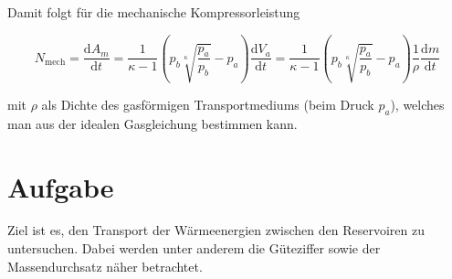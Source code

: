 Damit folgt für die mechanische Kompressorleistung


\begin{equation}
\label{eqn:mechleistung}
N_\text{mech} = \frac{\mathrm{d}A_m}{\mathrm{d}t} = \frac{1}{\kappa -1}\left(p_b \sqrt[\kappa]{\frac{p_a}{p_b}}-p_a\right)\frac{\mathrm{d}V_a}{\mathrm{d}t} = \frac{1}{\kappa-1}\left(p_b \sqrt[\kappa]{\frac{p_a}{p_b}}-p_a\right)\frac{1}{\rho} \frac{\mathrm{d}m} {\mathrm{d}t}
\end{equation}

mit $\rho$ als Dichte des gasförmigen Transportmediums (beim Druck $p_a$), welches man aus der idealen Gasgleichung bestimmen kann.

\section{Aufgabe}
\label{sec:Aufgabe}
Ziel ist es, den Transport der Wärmeenergien zwischen den Reservoiren zu untersuchen. Dabei werden unter anderem die Güteziffer sowie der Massendurchsatz näher betrachtet.
